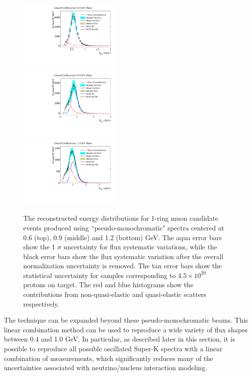 \begin{figure}[htpb]
\includegraphics[width=0.45\textwidth]{figures/lc_erec_600mev.pdf} \\
\includegraphics[width=0.45\textwidth]{figures/lc_erec_900mev.pdf} \\
\includegraphics[width=0.45\textwidth]{figures/lc_erec_1200mev.pdf} 
\caption{The reconstructed energy distributions for 1-ring muon candidate events produced using 
``pseudo-monochromatic" spectra centered at 0.6 (top), 0.9 (middle) and 1.2 (bottom) GeV.  The aqua error bars show
the 1 $\sigma$ uncertainty for flux systematic variations, while the black error bars show the flux systematic variation after the
overall normalization uncertainty is removed.  The tan error bars show the statistical uncertainty for samples corresponding to 
 $4.5\times10^{20}$ protons on target.  The red and blue histograms show the contributions from non-quasi-elastic and quasi-elastic
scatters respectively. }
\label{fig:mono_beam_erec}
\end{figure}

The \nuprism technique can be expanded beyond these pseudo-monochromatic beams. This linear combination method can be used to reproduce a wide variety of flux shapes between 0.4 and 1.0 GeV. In particular, as described later in this section, it is possible to reproduce all possible oscillated Super-K spectra with a linear combination of \nuprism measurements, which significantly reduces many of the uncertainties associated with neutrino/nucleus interaction modeling.
